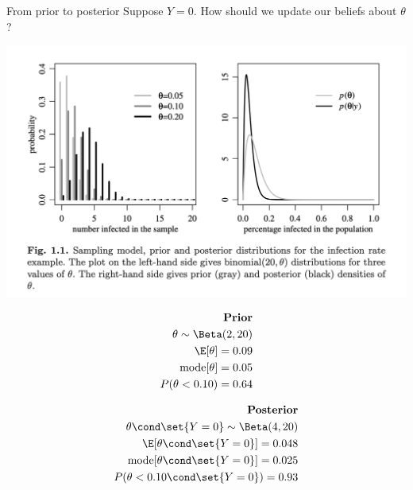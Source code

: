 \documentclass[10pt]{beamer}
\begin{document}
\begin{frame}{From prior to posterior}
\scriptsize
Suppose $Y=0$. How should we update our beliefs about $\theta$?
\begin{center}
\includegraphics[width=.75\textwidth]{images/hoff_fig1dot1_prior_posterior_shift}
\end{center}


\begin{minipage}{.45\textwidth}

\begin{align*}
\textbf{Prior} & \\
\theta  \sim  \Beta(2,20)   &\\ 
\E[\theta]  = 0.09 &\\
\text{mode}[\theta] =0.05 &\\
P(\theta < 0.10) = 0.64 &\\
\end{align*}

\end{minipage} \hfill
\begin{minipage}{.45\textwidth}

\begin{align*}
\textbf{Posterior} & \\
\theta \cond \set{Y=0}  \sim  \Beta(4,20)  &  \\ 
\E[\theta \cond \set{Y=0}  ] = 0.048& \\
\text{mode}[\theta \cond \set{Y=0}  ] =0.025& \\
P(\theta < 0.10 \cond \set{Y=0} ) = 0.93 &\\
\end{align*}

\end{minipage}


\end{frame}
\end{document}
